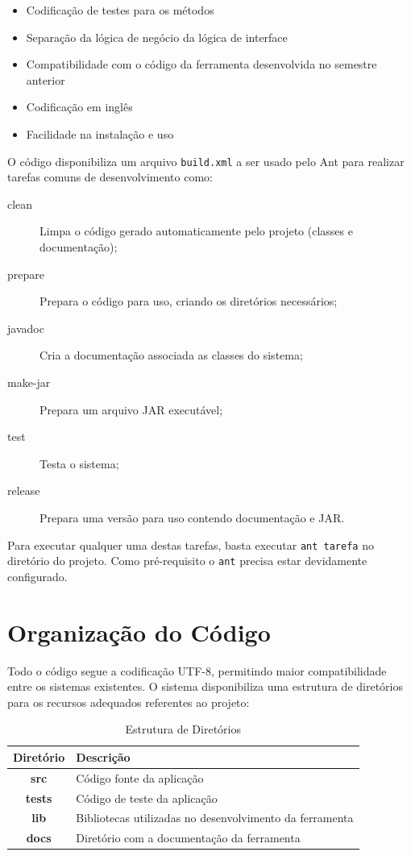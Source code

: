 \documentclass[a4paper,10pt]{report}
\begin{document}
\begin{itemize}
 \item Codificação de testes para os métodos
 \item Separação da lógica de negócio da lógica de interface
 \item Compatibilidade com o código da ferramenta desenvolvida no semestre anterior\cite{msnlab}
 \item Codificação em inglês
 \item Facilidade na instalação e uso
\end{itemize}

O código disponibiliza um arquivo \texttt{build.xml} a ser usado pelo Ant\cite{ant} para realizar tarefas comuns de desenvolvimento como:

\begin{description}
 \item[clean] Limpa o código gerado automaticamente pelo projeto (classes e documentação);
 \item[prepare] Prepara o código para uso, criando os diretórios necessários;
 \item[javadoc] Cria a documentação associada as classes do sistema;
 \item[make-jar] Prepara um arquivo JAR executável;
 \item[test] Testa o sistema;
 \item[release] Prepara uma versão para uso contendo documentação e JAR.
 \end{description}

Para executar qualquer uma destas tarefas, basta executar \texttt{ant tarefa} no diretório do projeto. Como pré-requisito o \texttt{ant} precisa estar devidamente configurado.

\section{Organização do Código}

Todo o código segue a codificação UTF-8, permitindo maior compatibilidade entre os sistemas existentes. O sistema disponibiliza uma estrutura de diretórios para os recursos adequados referentes ao projeto:

\begin{table}[ht]
\centering
\caption{Estrutura de Diretórios}
        \begin{tabular}{|c|p{2in}|}
        \hline
        \textbf{Diretório} & \textbf{Descrição} \\ \hline
        \textbf{src} & Código fonte da aplicação \\ \hline
        \textbf{tests} & Código de teste da aplicação \\ \hline
        \textbf{lib} & Bibliotecas utilizadas no desenvolvimento da ferramenta \\ \hline
        \textbf{docs} & Diretório com a documentação da ferramenta \\ \hline
        \end{tabular}
\label{tab:diretorios}
\end{table} 
\end{document}
